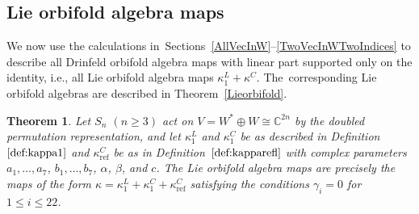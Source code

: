 \documentclass[10pt,a4paper]{amsart}
\numberwithin{equation}{section}
\newtheorem{Theorem}{Theorem}[section]
\DeclareMathOperator{\refl}{ref}
\begin{document}
\subsection{Lie orbifold algebra maps}

We now use the calculations in~Sections~\ref{AllVecInW}--\ref{TwoVecInWTwoIndices}
to describe all Drinfeld orbifold algebra maps with linear part
supported only on the identity, i.e., all Lie orbifold algebra maps
$\kappa^L_1+\kappa^C$. The~corresponding Lie orbifold algebras are
described in Theorem~\ref{Lieorbifold}.

\begin{Theorem}
\label{thm:LOAMapsDoubledPerm}
Let $S_n$ $(n \geq 3)$ act on $V=W^* \oplus W \cong \mathbb{C}^{2n}$ by the
doubled permutation representation, and let $\kappa^L_1$ and $\kappa^C_1$
be as described in Definition~$\ref{def:kappa1}$ and
$\kappa^C_{\refl}$ be as in Definition~$\ref{def:kapparefl}$ with
complex parameters $a_1,\dots,a_7$, $b_1,\dots,b_7$, $\alpha$, $\beta$, and $c$.
The Lie orbifold algebra maps are precisely the maps of the form
$\kappa=\kappa^L_1+\kappa^C_1+\kappa^C_{\refl}$ satisfying the
conditions $\gamma_i=0$ for $1 \leq i \leq 22$.
\end{Theorem}
\end{document}
